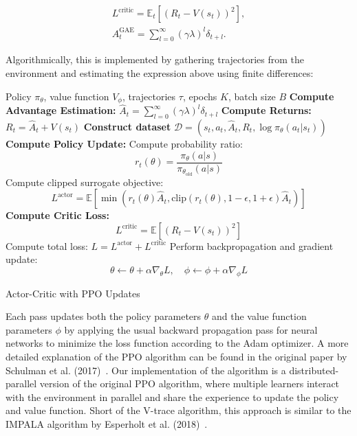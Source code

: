\begin{gather*}
    L^{\text{critic}} = \mathbb{E}_t \left[ \left( R_t - V(s_t) \right)^2 \right],\\
    A^{\text{GAE}}_t = \sum_{l=0}^{\infty} (\gamma \lambda)^l \delta_{t+l}.
\end{gather*}

Algorithmically, this is implemented by gathering trajectories from the environment and estimating the expression above using finite differences:

\begin{algorithm}[H]
    \begin{algorithmic}[1]
        \Require Policy $\pi_\theta$, value function $V_\phi$, trajectories $\tau$, epochs $K$, batch size $B$
        \State \textbf{Compute Advantage Estimation:}
        \State $\hat{A}_t = \sum_{l=0}^{\infty} (\gamma \lambda)^l \delta_{t+l}$
        \State \textbf{Compute Returns:} $R_t = \hat{A}_t + V(s_t)$
        \State \textbf{Construct dataset} $\mathcal{D} = (s_t, a_t, \hat{A}_t, R_t, \log \pi_\theta(a_t | s_t))$
                \State \textbf{Compute Policy Update:}
                \State Compute probability ratio:
                \[
                    r_t(\theta) = \frac{\pi_\theta(a | s)}{\pi_{\theta_{\text{old}}}(a | s)}
                \]
                \State Compute clipped surrogate objective:
                \[
                    L^{\text{actor}} = \mathbb{E} \left[ \min(r_t(\theta) \hat{A}_t, \text{clip}(r_t(\theta), 1 - \epsilon, 1 + \epsilon) \hat{A}_t) \right]
                \]
                \State \textbf{Compute Critic Loss:}
                \[
                    L^{\text{critic}} = \mathbb{E} \left[ (R_t - V(s_t))^2 \right]
                \]
                \State Compute total loss: $L = L^{\text{actor}} + L^{\text{critic}}$
                \State Perform backpropagation and gradient update:
                \[
                    \theta \gets \theta + \alpha \nabla_\theta L, \quad \phi \gets \phi + \alpha \nabla_\phi L
                \]
            \EndFor
        \EndFor
    \end{algorithmic}
    \caption{Actor-Critic with PPO Updates}
    \label{alg:ppo}
\end{algorithm}

Each pass updates both the policy parameters $\theta$ and the value function parameters $\phi$
by applying the usual backward propagation pass for neural networks to minimize the loss function according to the Adam optimizer.
A more detailed explanation of the PPO algorithm can be found in the original paper by Schulman et al. (2017)~\cite{Schulman2017}.
Our implementation of the algorithm is a distributed-parallel version of the original PPO algorithm,
where multiple learners interact with the environment in parallel and share the experience to update the policy and value function.
Short of the V-trace algorithm, this approach is similar to the IMPALA algorithm by Esperholt et al. (2018)~\cite{Espeholt2018}.

